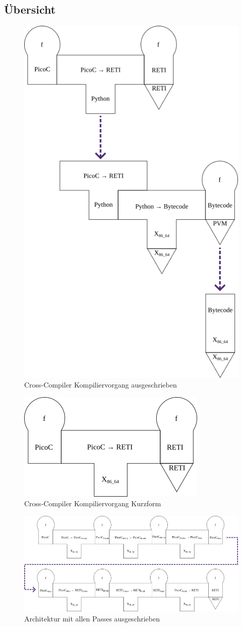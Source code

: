\subsection{Übersicht}

\begin{figure}[H]
  \centering
  \includegraphics[width=0.5\linewidth]{./figures/summarized_cross_compiler.png}
  \caption{Cross-Compiler Kompiliervorgang ausgeschrieben}
\end{figure}

\begin{figure}[H]
  \centering
  \includegraphics[width=0.33\linewidth]{./figures/compiliervorang_mit_machiene.png}
  \caption{Cross-Compiler Kompiliervorgang Kurzform}
\end{figure}

\begin{figure}[H]
  \centering
  \includegraphics[width=\linewidth]{./figures/passes.png}
  \caption{Architektur mit allen Passes ausgeschrieben}
\end{figure}

